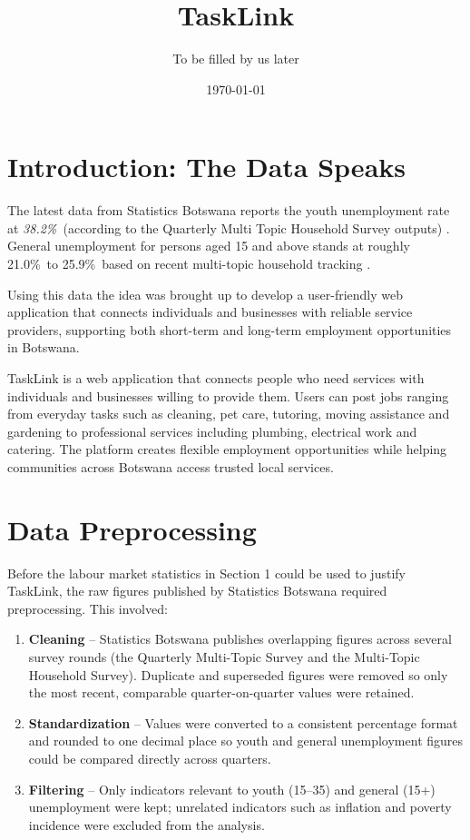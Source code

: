 \documentclass[12pt]{article}
\title{TaskLink}
\author{To be filled by us later}
\date{\today}
\begin{document}
\maketitle
\tableofcontents

\section{Introduction: The Data Speaks}
The latest data from Statistics Botswana reports the youth unemployment rate at \emph{38.2\%\ }(according to the Quarterly Multi Topic Household Survey outputs) \citep{statsbw2024}. General unemployment for persons aged 15 and above stands at roughly 21.0\%\ to 25.9\%\ based on recent multi-topic household tracking \citep{statsbw2024, statsbw2023q3}.

Using this data the idea was brought up to develop a user-friendly web application that connects individuals and businesses with reliable service providers, supporting both short-term and long-term employment opportunities in Botswana.

TaskLink is a web application that connects people who need services with individuals and businesses willing to provide them. Users can post jobs ranging from everyday tasks such as cleaning, pet care, tutoring, moving assistance and gardening to professional services including plumbing, electrical work and catering. The platform creates flexible employment opportunities while helping communities across Botswana access trusted local services.

\section{Data Preprocessing}
Before the labour market statistics in Section 1 could be used to justify TaskLink, the raw figures published by Statistics Botswana required preprocessing. This involved:
\begin{enumerate}
\item \textbf{Cleaning} -- Statistics Botswana publishes overlapping figures across several survey rounds (the Quarterly Multi-Topic Survey and the Multi-Topic Household Survey). Duplicate and superseded figures were removed so only the most recent, comparable quarter-on-quarter values were retained.
\item \textbf{Standardization} -- Values were converted to a consistent percentage format and rounded to one decimal place so youth and general unemployment figures could be compared directly across quarters.
\item \textbf{Filtering} -- Only indicators relevant to youth (15--35) and general (15+) unemployment were kept; unrelated indicators such as inflation and poverty incidence were excluded from the analysis.
\end{enumerate}
\end{document}
